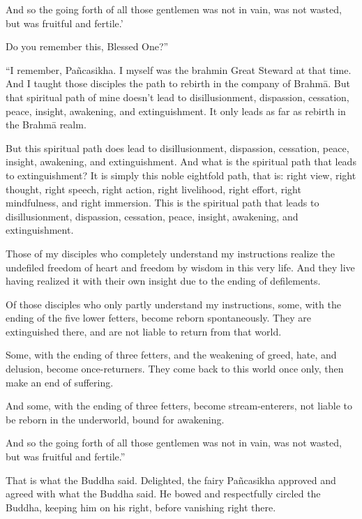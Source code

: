 \documentclass[12pt,openany]{book}%
\begin{document}
And so the going forth of all those gentlemen was not in vain, was not wasted, but was fruitful and fertile.’ 

Do you remember this, Blessed One?” 

“I remember, \textsanskrit{Pañcasikha}. I myself was the brahmin Great Steward at that time. And I taught those disciples the path to rebirth in the company of \textsanskrit{Brahmā}. But that spiritual path of mine doesn’t lead to disillusionment, dispassion, cessation, peace, insight, awakening, and extinguishment. It only leads as far as rebirth in the \textsanskrit{Brahmā} realm. 

But this spiritual path does lead to disillusionment, dispassion, cessation, peace, insight, awakening, and extinguishment. And what is the spiritual path that leads to extinguishment? It is simply this noble eightfold path, that is: right view, right thought, right speech, right action, right livelihood, right effort, right mindfulness, and right immersion. This is the spiritual path that leads to disillusionment, dispassion, cessation, peace, insight, awakening, and extinguishment. 

Those of my disciples who completely understand my instructions realize the undefiled freedom of heart and freedom by wisdom in this very life. And they live having realized it with their own insight due to the ending of defilements. 

Of those disciples who only partly understand my instructions, some, with the ending of the five lower fetters, become reborn spontaneously. They are extinguished there, and are not liable to return from that world. 

Some, with the ending of three fetters, and the weakening of greed, hate, and delusion, become once-returners. They come back to this world once only, then make an end of suffering. 

And some, with the ending of three fetters, become stream-enterers, not liable to be reborn in the underworld, bound for awakening. 

And so the going forth of all those gentlemen was not in vain, was not wasted, but was fruitful and fertile.” 

That is what the Buddha said. Delighted, the fairy \textsanskrit{Pañcasikha} approved and agreed with what the Buddha said. He bowed and respectfully circled the Buddha, keeping him on his right, before vanishing right there. 
\end{document}

